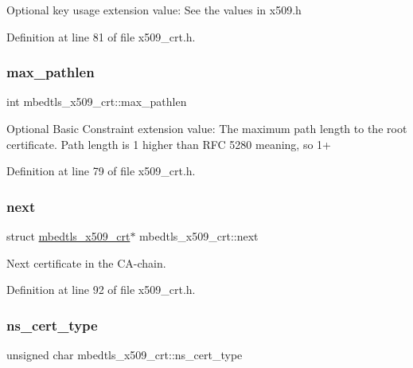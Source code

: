 Optional key usage extension value\+: See the values in x509.\+h 

Definition at line 81 of file x509\+\_\+crt.\+h.

\mbox{\label{structmbedtls__x509__crt_ab0af43652f426ace28052ec47fdde6fb}} 
\subsubsection{\texorpdfstring{max\+\_\+pathlen}{max\_pathlen}}
{\footnotesize\ttfamily int mbedtls\+\_\+x509\+\_\+crt\+::max\+\_\+pathlen}

Optional Basic Constraint extension value\+: The maximum path length to the root certificate. Path length is 1 higher than R\+FC 5280 \textquotesingle{}meaning\textquotesingle{}, so 1+ 

Definition at line 79 of file x509\+\_\+crt.\+h.

\mbox{\label{structmbedtls__x509__crt_ac9dbc43b90ddd74fe55452495a304923}} 
\subsubsection{\texorpdfstring{next}{next}}
{\footnotesize\ttfamily struct \mbox{\hyperlink{structmbedtls__x509__crt}{mbedtls\+\_\+x509\+\_\+crt}}$\ast$ mbedtls\+\_\+x509\+\_\+crt\+::next}

Next certificate in the C\+A-\/chain. 

Definition at line 92 of file x509\+\_\+crt.\+h.

\mbox{\label{structmbedtls__x509__crt_adc36c60aa279fae8bd35a20b9c2bba22}} 
\subsubsection{\texorpdfstring{ns\+\_\+cert\+\_\+type}{ns\_cert\_type}}
{\footnotesize\ttfamily unsigned char mbedtls\+\_\+x509\+\_\+crt\+::ns\+\_\+cert\+\_\+type}

